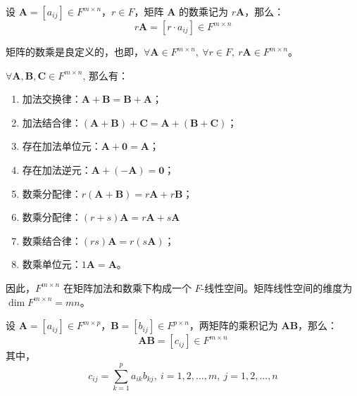 \begin{definition}
    设 $\mathbf{A} = [a_{ij}] \in F^{m \times n}$，$r\in F$，矩阵 $\mathbf{A}$ 的数乘记为 $r\mathbf{A}$，那么：
    \[
       r\mathbf{A} = [r \cdot a_{ij}] \in F^{m \times n}
    \]
\end{definition}

\begin{proposition}
    矩阵的数乘是良定义的，也即，$\forall \mathbf{A}\in F^{m \times n},\ \forall r\in F,\ r\mathbf{A}\in F^{m \times n}$。
\end{proposition}

\begin{proposition}[矩阵线性空间]
    $\forall \mathbf{A}, \mathbf{B},\mathbf{C} \in F^{m\times n}$, 那么有：
    \begin{enumerate}
        \item 加法交换律：$\mathbf{A} + \mathbf{B} = \mathbf{B} + \mathbf{A}$；
        \item 加法结合律：$(\mathbf{A} + \mathbf{B}) + \mathbf{C} = \mathbf{A} + (\mathbf{B} + \mathbf{C})$；
        \item 存在加法单位元：$\mathbf{A} + \mathbf{0} = \mathbf{A}$；
        \item 存在加法逆元：$\mathbf{A} + (-\mathbf{A}) = \mathbf{0}$；
        \item 数乘分配律：$r(\mathbf{A} + \mathbf{B}) = r\mathbf{A} + r\mathbf{B}$；
        \item 数乘分配律：$(r+s)\mathbf{A} = r\mathbf{A} + s\mathbf{A}$
        \item 数乘结合律：$(rs)\mathbf{A} = r(s\mathbf{A})$；
        \item 数乘单位元：$1\mathbf{A} = \mathbf{A}$。
    \end{enumerate}
    因此，$F^{m \times n}$ 在矩阵加法和数乘下构成一个 $F$-线性空间。矩阵线性空间的维度为 $\dim F^{m \times n} = mn$。
\end{proposition}
\vspace{1em}

\begin{definition}
    设 $\mathbf{A} = [a_{ij}] \in F^{m \times p}$，$\mathbf{B} = [b_{ij}] \in F^{p \times n}$，两矩阵的乘积记为 $\mathbf{A}\mathbf{B}$，那么：
    \[
       \mathbf{A}\mathbf{B} = [c_{ij}] \in F^{m \times n}
    \]
    其中，
    \[
        c_{ij} = \sum_{k=1}^{p} a_{ik} b_{kj},\ i=1,2,\ldots,m,\ j=1,2,\ldots,n
    \]
    \label{def:matrix_multiplication}
\end{definition}

